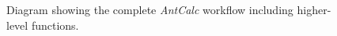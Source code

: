 \begin{figure}[h!]
\caption{\centering Diagram showing the complete \textit{AntCalc} workflow including higher-level functions.}
\label{fig:higher-level}
\end{figure}

